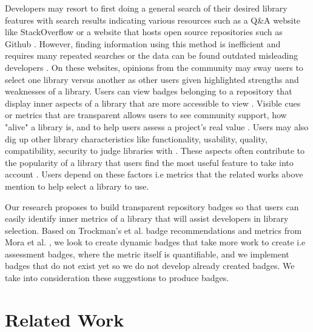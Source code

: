 \documentclass[12pt, letterpaper]{article}
\begin{document}
Developers may resort to first doing a general search of their desired library features with 
search results indicating
various resources such as a Q\&A website like StackOverflow \cite{stackoverflow} or 
a website that hosts open source repositories such as Github \cite{github}. However, finding information using
this method is inefficient and requires many repeated searches or the data can be found outdated
misleading developers \cite{analogical}. On
these websites, opinions from the community
\cite{opinerarticle} may sway users to select one library versus another as other users given highlighted
strengths and weaknesses of a library. 
Users can view badges belonging to a repository that display inner aspects of a library that are
more accessible to view
\cite{githubbadges}. Visible cues or metrics that are transparent allows users
to see community support, how "alive" a library is, and to help users assess a project's real value
\cite{metrics, transparency}. Users may also dig up other library characteristics like functionality, usability,
quality, compatibility, security to judge libraries with \cite{githubbadges, metrics, librarytrends}. 
These aspects often contribute to the popularity of a library
\cite{librarytrends, apiwave} that users find the most useful feature to take into account \cite{empiricalmetrics}.
Users depend on these factors i.e metrics that the related works above mention to help select a library to use. 


Our research proposes to build transparent repository badges so that users can 
easily identify inner metrics of a library
that will assist developers in library selection. 
Based on Trockman's et al. \cite{githubbadges} badge recommendations and metrics from Mora et al. \cite{metrics},
we look to create 
dynamic badges that take more work to create i.e assessment badges, where the metric itself is quantifiable, and
we implement badges that do not exist yet so we do not develop already created badges.
We take into consideration these suggestions to produce badges.


\section{Related Work}
\end{document}

